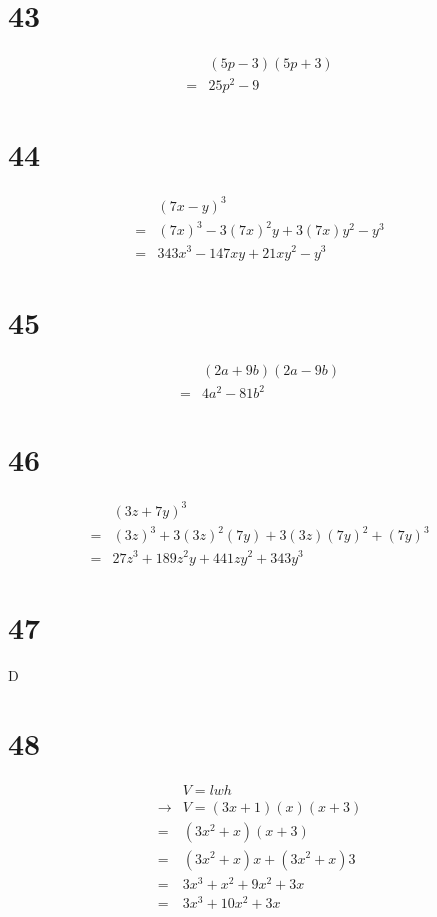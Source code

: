 \documentclass{article}
\theoremstyle{definition}
\begin{document}
\section*{43}
\[
\begin{array}{rl}
	& (5p-3)(5p+3) \\
=	& 25p^2-9
\end{array}
\]

\section*{44}
\[
\begin{array}{rl}
	& (7x-y)^3 \\
=	& (7x)^3-3(7x)^2y+3(7x)y^2-y^3 \\
=	& 343x^3-147xy+21xy^2-y^3
\end{array}
\]

\section*{45}
\[
\begin{array}{rl}
	& (2a+9b)(2a-9b) \\
=	& 4a^2-81b^2
\end{array}
\]

\section*{46}
\[
\begin{array}{rl}
	& (3z+7y)^3 \\
=	& (3z)^3+3(3z)^2(7y)+3(3z)(7y)^2+(7y)^3 \\
=	& 27z^3+189z^2y+441zy^2+343y^3
\end{array}
\]

\section*{47}
D

\section*{48}
\[
\begin{array}{rl}
	& V=lwh\\
\rightarrow & V=(3x+1)(x)(x+3) \\
=	& (3x^2+x)(x+3) \\
=	& (3x^2+x)x+(3x^2+x)3 \\
=	& 3x^3+x^2+9x^2+3x \\
=	& 3x^3+10x^2+3x
\end{array}
\]
\end{document}
